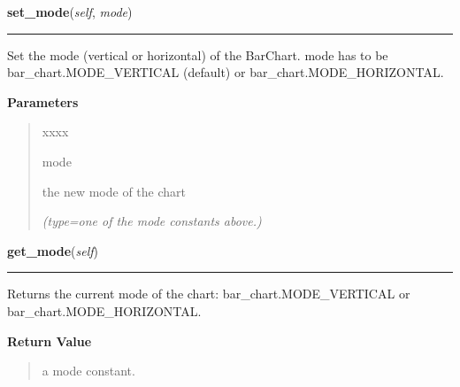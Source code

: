     \label{pygtk_chart:bar_chart:BarChart:set_mode}

    \vspace{0.5ex}

\hspace{.8\funcindent}\begin{boxedminipage}{\funcwidth}

    \raggedright \textbf{set\_mode}(\textit{self}, \textit{mode})

    \vspace{-1.5ex}

    \rule{\textwidth}{0.5\fboxrule}
\setlength{\parskip}{2ex}
    Set the mode (vertical or horizontal) of the BarChart. mode has to be 
    bar\_chart.MODE\_VERTICAL (default) or bar\_chart.MODE\_HORIZONTAL.

\setlength{\parskip}{1ex}
      \textbf{Parameters}
      \vspace{-1ex}

      \begin{quote}
        \begin{Ventry}{xxxx}

          \item[mode]

          the new mode of the chart

            {\it (type=one of the mode constants above.)}

        \end{Ventry}

      \end{quote}

    \end{boxedminipage}

    \label{pygtk_chart:bar_chart:BarChart:get_mode}

    \vspace{0.5ex}

\hspace{.8\funcindent}\begin{boxedminipage}{\funcwidth}

    \raggedright \textbf{get\_mode}(\textit{self})

    \vspace{-1.5ex}

    \rule{\textwidth}{0.5\fboxrule}
\setlength{\parskip}{2ex}
    Returns the current mode of the chart: bar\_chart.MODE\_VERTICAL or 
    bar\_chart.MODE\_HORIZONTAL.

\setlength{\parskip}{1ex}
      \textbf{Return Value}
    \vspace{-1ex}

      \begin{quote}
      a mode constant.

      \end{quote}

    \end{boxedminipage}

